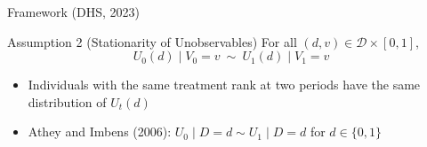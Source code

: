 \documentclass[aspectratio=1610, 9pt]{beamer}
\begin{document}








\begin{frame}{Framework (DHS, 2023)}
\begin{block}{Assumption 2 (Stationarity of Unobservables)}\label{ass:stationary}
  For all $(d,v)\in\mathcal{D}\times[0,1]$,
    $$U_{0}(d)\mid V_{0}=v \ \sim \  U_{1}(d)\mid V_{1}=v$$

\end{block}
\vspace{0.5cm}
\begin{itemize}
    \item Individuals with the same treatment rank at two periods have the same distribution of $U_t(d)$
    \item Athey and Imbens (2006): $U_{0}\mid D=d\sim U_{1}\mid D=d$ for $d\in\{0,1\}$
\end{itemize}

\end{frame}
\end{document}
